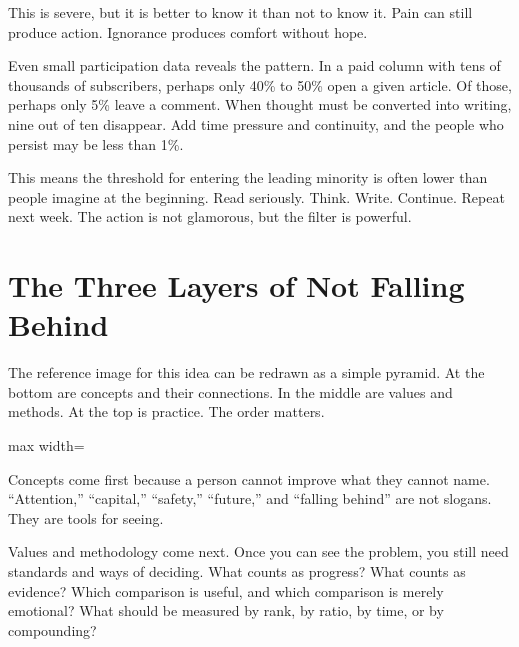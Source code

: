 This is severe, but it is better to know it than not to know it. Pain can still produce action. Ignorance produces comfort without hope.

Even small participation data reveals the pattern. In a paid column with tens of thousands of subscribers, perhaps only 40\% to 50\% open a given article. Of those, perhaps only 5\% leave a comment. When thought must be converted into writing, nine out of ten disappear. Add time pressure and continuity, and the people who persist may be less than 1\%.

This means the threshold for entering the leading minority is often lower than people imagine at the beginning. Read seriously. Think. Write. Continue. Repeat next week. The action is not glamorous, but the filter is powerful.

\section*{The Three Layers of Not Falling Behind}

The reference image for this idea can be redrawn as a simple pyramid. At the bottom are concepts and their connections. In the middle are values and methods. At the top is practice. The order matters.

\begin{center}
\begin{adjustbox}{max width=\linewidth}
\end{adjustbox}
\end{center}

Concepts come first because a person cannot improve what they cannot name. ``Attention,'' ``capital,'' ``safety,'' ``future,'' and ``falling behind'' are not slogans. They are tools for seeing.

Values and methodology come next. Once you can see the problem, you still need standards and ways of deciding. What counts as progress? What counts as evidence? Which comparison is useful, and which comparison is merely emotional? What should be measured by rank, by ratio, by time, or by compounding?

